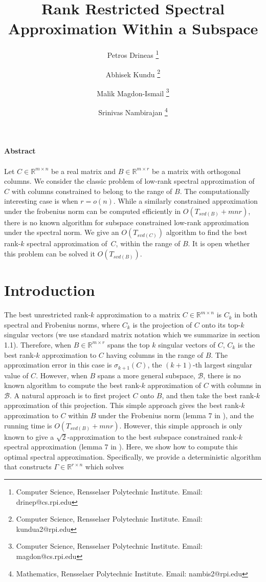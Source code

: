 \documentclass[11pt]{article}
\title{Rank Restricted Spectral Approximation  Within a Subspace \\ }
\author {Petros Drineas \footnote{Computer Science, Rensselaer Polytechnic Institute. Email: drinep@cs.rpi.edu} \\
\and
Abhisek Kundu \footnote{Computer Science, Rensselaer Polytechnic Institute. Email: kundua2@rpi.edu} \\
\and
Malik Magdon-Ismail \footnote{Computer Science, Rensselaer Polytechnic Institute. Email: magdon@cs.rpi.edu} \\
\and
Srinivas Nambirajan \footnote{Mathematics, Rensselaer Polytechnic Institute. Email: nambis2@rpi.edu} \\
\date{}
}
\def\reals{\mathbb{R}}
\newcommand{\B}{\mathcal{B}}
\newcommand{\G}{\Gamma}
\newcommand{\0}{\ensuremath{\mathbf{0}}}
\renewcommand{\>}{\succ}
\newcommand{\<}{\prec}
\begin{document}
         
\maketitle
\noindent \textbf{\small Abstract}
\\
\\ 
Let $C \in \reals^{m \times n}$ be a real matrix and $B \in \reals^{m \times r}$ be a matrix with orthogonal columns.
We consider the classic problem of low-rank spectral approximation of $C$ with columns constrained to belong to the range of $B$. The computationally interesting case is when $r = o(n)$. While a similarly constrained approximation under the frobenius norm can be computed efficiently in $O(T_{svd(B)}+ mnr)$, there is no known algorithm for subspace constrained low-rank approximation under the spectral norm. We give an $O(T_{svd(C)})$ algorithm to find the best rank-$k$ spectral approximation of~$C$, within the range of $B$. It is open whether this problem can be solved it $O(T_{svd(B)})$.

\section{Introduction}
The best unrestricted rank-$k$ approximation to a matrix $C \in \reals^{m \times n}$ is $C_k$ in both spectral and Frobenius norms, where $C_k$ is the projection of $C$ onto its top-$k$ singular vectors (we use standard matrix notation which we summarize in section 1.1). Therefore, when $B \in \reals^{m \times r}$ spans the top $k$ singular vectors of $C$, $C_k$ is the best rank-$k$ approximation to $C$ having columns in the range of $B$. The approximation error in this case is $\sigma_{k+1}(C)$, the $(k+1)$-th largest singular value of $C$. 
However, when $B$ spans a more general subspace, $\B$, there is no known algorithm to compute the best rank-$k$ approximation of $C$ with columns in $\B$. A natural approach is to first project $C$ onto $B$, and then take the best rank-$k$ approximation of this projection. This simple approach gives the best rank-$k$ approximation to $C$ within $B$ under the Frobenius norm (lemma 7 in \cite{BDM}), and the running time is $O(T_{svd(B)}+ mnr)$.  However, this simple approach is only 
known to give a $\sqrt{2}$-approximation to the best subspace constrained rank-$k$ spectral approximation (lemma 7 in \cite{BDM}). 
Here, we show how to compute this optimal spectral approximation. Specifically, we provide a deterministic algorithm that constructs $\G \in \reals^{r \times n}$ which solves
\end{document}
